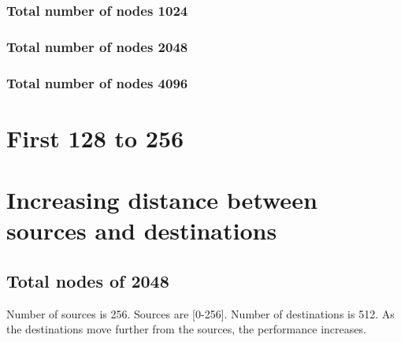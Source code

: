 \documentclass[letter]{article}
\begin{document}
\subsubsection{Total number of nodes 1024}





\clearpage
\newpage

\subsubsection {Total number of nodes 2048}





\clearpage
\newpage

\subsubsection {Total number of nodes 4096}





\clearpage
\newpage


\section{First 128 to 256}

\clearpage
\newpage

\section {Increasing distance between sources and destinations}

\subsection{Total nodes of 2048}

Number of sources is 256. Sources are [0-256]. Number of destinations is 512. As the destinations move further from the sources, the performance increases.
\end{document}

